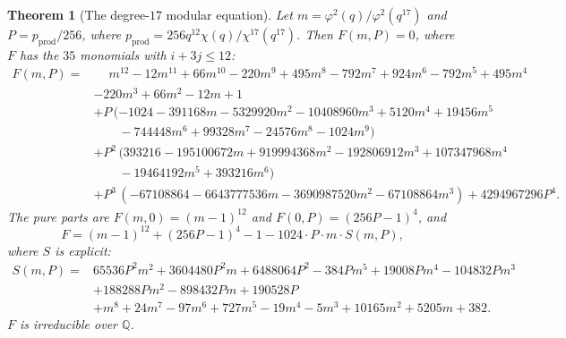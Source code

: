 \documentclass[11pt]{amsart}
\theoremstyle{plain}
\newtheorem{theorem}{Theorem}[section]
\theoremstyle{definition}
\theoremstyle{remark}
\newcommand{\Q}{\mathbb{Q}}
\newcommand{\pprod}{p_{\mathrm{prod}}}
\begin{document}
\begin{theorem}[The degree-$17$ modular equation]
\label{thm:p17}
Let $m = \varphi^2(q)/\varphi^2(q^{17})$ and $P = \pprod/256$, where
$\pprod = 256q^{12}\chi(q)/\chi^{17}(q^{17})$. Then $F(m,P) = 0$, where
$F$ has the $35$ monomials with $i + 3j \leq 12$:
\begin{align}
F(m,P) ={}& \phantom{+} m^{12} - 12m^{11} + 66m^{10} - 220m^9 + 495m^8
- 792m^7 + 924m^6 - 792m^5 + 495m^4 \nonumber \\
&- 220m^3 + 66m^2 - 12m + 1 \nonumber \\
&+ P\,(-1024 - 391168m - 5329920m^2 - 10408960m^3 + 5120m^4 + 19456m^5
\nonumber \\
&\qquad - 744448m^6 + 99328m^7 - 24576m^8 - 1024m^9) \nonumber \\
&+ P^2\,(393216 - 195100672m + 919994368m^2 - 192806912m^3
+ 107347968m^4 \nonumber \\
&\qquad - 19464192m^5 + 393216m^6) \nonumber \\
&+ P^3\,(-67108864 - 6643777536m - 3690987520m^2 - 67108864m^3)
+ 4294967296P^4.
\label{eq:F17}
\end{align}
The pure parts are $F(m,0) = (m-1)^{12}$ and $F(0,P) = (256P-1)^4$, and
\begin{equation}
F = (m-1)^{12} + (256P-1)^4 - 1 - 1024\cdot P\cdot m\cdot S(m,P),
\label{eq:F17struct}
\end{equation}
where $S$ is explicit:
\begin{align}
S(m,P) ={}& 65536P^2m^2 + 3604480P^2m + 6488064P^2
- 384Pm^5 + 19008Pm^4 - 104832Pm^3 \nonumber \\
&+ 188288Pm^2 - 898432Pm + 190528P \nonumber \\
&+ m^8 + 24m^7 - 97m^6 + 727m^5 - 19m^4 - 5m^3 + 10165m^2 + 5205m + 382.
\end{align}
$F$ is irreducible over $\Q$.
\end{theorem}
\end{document}
